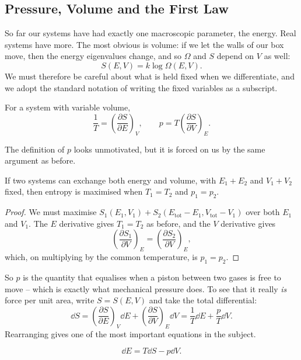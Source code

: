 \documentclass[a4paper]{scrartcl}
\begin{document}
\subsection{Pressure, Volume and the First Law}

So far our systems have had exactly one macroscopic parameter, the energy. Real systems have more. The most obvious is volume: if we let the walls of our box move, then the energy eigenvalues change, and so $\Omega$ and $S$ depend on $V$ as well:
$$
S(E,V) = k\log \Omega(E,V).
$$
We must therefore be careful about what is held fixed when we differentiate, and we adopt the standard notation of writing the fixed variables as a subscript.

\begin{definition}
	For a system with variable volume,
	$$
	\frac 1T = \left(\frac{\partial S}{\partial E}\right)_V, \qquad p = T\left(\frac{\partial S}{\partial V}\right)_E.
	$$
\end{definition}

The definition of $p$ looks unmotivated, but it is forced on us by the same argument as before.

\begin{proposition}
	If two systems can exchange both energy and volume, with $E_1 + E_2$ and $V_1 + V_2$ fixed, then entropy is maximised when $T_1 = T_2$ and $p_1 = p_2$.
\end{proposition}
\begin{proof}
	We must maximise $S_1(E_1, V_1) + S_2(E_{\mathrm{tot}} - E_1, V_{\mathrm{tot}} - V_1)$ over both $E_1$ and $V_1$. The $E$ derivative gives $T_1 = T_2$ as before, and the $V$ derivative gives
	$$
	\left(\frac{\partial S_1}{\partial V}\right)_E = \left(\frac{\partial S_2}{\partial V}\right)_E,
	$$
	which, on multiplying by the common temperature, is $p_1 = p_2$.
\end{proof}

So $p$ is the quantity that equalises when a piston between two gases is free to move -- which is exactly what mechanical pressure does. To see that it really \emph{is} force per unit area, write $S = S(E,V)$ and take the total differential:
$$
\dd S = \left(\frac{\partial S}{\partial E}\right)_V \dd E + \left(\frac{\partial S}{\partial V}\right)_E \dd V = \frac{1}{T}\dd E + \frac pT \dd V.
$$
Rearranging gives one of the most important equations in the subject.

\begin{proposition}
	$$
	\dd E = T \dd S - p \dd V.
	$$
\end{proposition}
\end{document}

